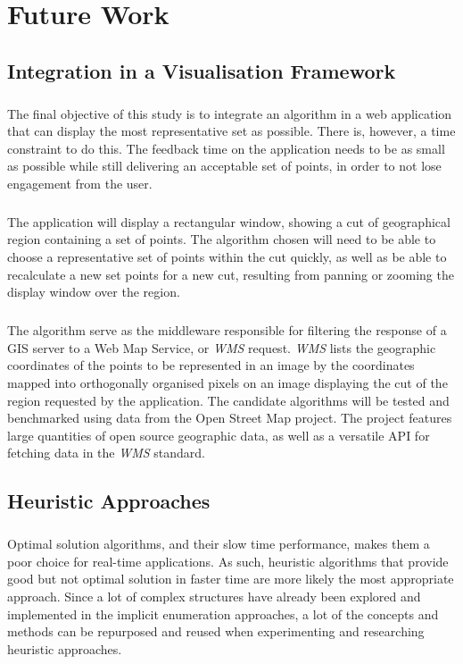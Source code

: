 \chapter{Future Work}
\label{chap:future}
\section{Integration in a Visualisation Framework}
\paragraph{}
The final objective of this study is to integrate an algorithm in a web application that can display the most representative set as possible. There is, however, a time constraint to do this. The feedback time on the application needs to be as small as possible while still delivering an acceptable set of points, in order to not lose engagement from the user.
\paragraph{}
The application will display a rectangular window, showing a cut of geographical region containing a set of points. The algorithm chosen will need to be able to choose a representative set of points within the cut quickly, as well as be able to recalculate a new set points for a new cut, resulting from panning or zooming the display window over the region.
\paragraph{}
The algorithm serve as the middleware responsible for filtering the response of a GIS server to a Web Map Service, or \emph{WMS} request. \emph{WMS} lists the geographic coordinates of the points to be represented in an image by the coordinates mapped into orthogonally organised pixels on an image displaying the cut of the region requested by the application.
The candidate algorithms will be tested and benchmarked using data from the Open Street Map project. The project features large quantities of open source geographic data, as well as a versatile API for fetching data in the \emph{WMS} standard.

\section{Heuristic Approaches}
\paragraph{}
Optimal solution algorithms, and their slow time performance, makes them a poor choice for real-time applications. As such, heuristic algorithms that provide good but not optimal solution in faster time are more likely the most appropriate approach.
Since a lot of complex structures have already been explored and implemented in the implicit enumeration approaches, a lot of the concepts and methods can be repurposed and reused when experimenting and researching heuristic approaches. 
